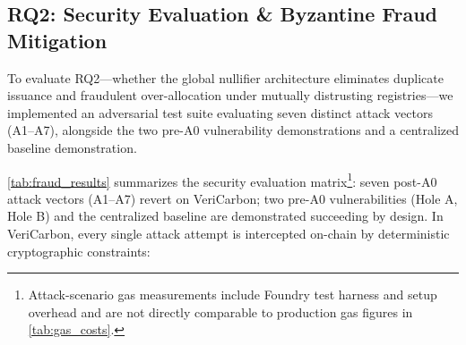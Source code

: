 \documentclass[preprint,12pt]{elsarticle}
\begin{document}
\subsection{RQ2: Security Evaluation \& Byzantine Fraud Mitigation}

To evaluate RQ2—whether the global nullifier architecture eliminates duplicate issuance and fraudulent over-allocation under mutually distrusting registries—we implemented an adversarial test suite evaluating seven distinct attack vectors (A1–A7), alongside the two pre-A0 vulnerability demonstrations and a centralized baseline demonstration.



\autoref{tab:fraud_results} summarizes the security evaluation matrix\footnote{Attack-scenario gas measurements include Foundry test harness and setup overhead and are not directly comparable to production gas figures in \autoref{tab:gas_costs}.}: seven post-A0 attack vectors (A1–A7) revert on VeriCarbon; two pre-A0 vulnerabilities (Hole A, Hole B) and the centralized baseline are demonstrated succeeding by design. In VeriCarbon, every single attack attempt is intercepted on-chain by deterministic cryptographic constraints:
\end{document}
